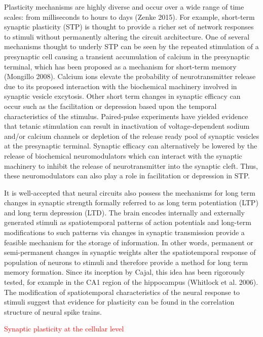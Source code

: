 \documentclass{ucetd}
\begin{document}
Plasticity mechanisms are highly diverse and occur over a wide range of time scales: from milliseconds to hours to days (Zenke 2015). For example, short-term synaptic plasticity (STP) is thought to provide a richer set of network responses to stimuli without permanently altering the circuit architecture. One of several mechanisms thought to underly STP can be seen by the repeated stimulation of a presynaptic cell causing a transient accumulation of calcium in the presynaptic terminal, which has been proposed as a mechanism for short-term memory (Mongillo 2008). Calcium ions elevate the probability of neurotransmitter release due to its proposed interaction with the biochemical machinery involved in synaptic vesicle excytosis. Other short term changes in synaptic efficacy can occur such as the facilitation or depression based upon the temporal characteristics of the stimulus. Paired-pulse experiments have yielded evidence that tetanic stimulation can result in inactivation of voltage-dependent sodium and/or calcium channels or depletion of the release ready pool of synaptic vesicles at the presynaptic terminal. Synaptic efficacy can alternatively be lowered by the release of biochemical neuromodulators which can interact with the synaptic machinery to inhibit the release of neurotransmitter into the synaptic cleft. Thus, these neuromodulators can also play a role in facilitation or depression in STP.

It is well-accepted that neural circuits also possess the mechanisms for long term changes in synaptic strength formally referred to as long term potentiation (LTP) and long term depression (LTD). The brain encodes internally and externally generated stimuli as spatiotemporal patterns of action potentials and long-term modifications to such patterns via changes in synaptic transmission provide a feasible mechanism for the storage of information. In other words, permanent or semi-permanent changes in synaptic weights alter the spatiotemporal response of population of neurons to stimuli and therefore provide a method for long term memory formation. Since its inception by Cajal, this idea has been rigorously tested, for example in the CA1 region of the hippocampus (Whitlock et al. 2006). The modification of spatiotemporal characteristics of the neural response to stimuli suggest that evidence for plasticity can be found in the correlation structure of neural spike trains.

\textcolor{red}{Synaptic plasticity at the cellular level}
\end{document}
